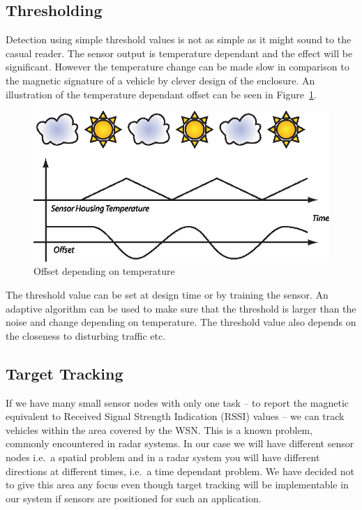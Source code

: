 \subsection{Thresholding}
Detection using simple threshold values is not as simple as it might sound to the casual reader. The sensor output is temperature dependant and the effect will be significant. However the temperature change can be made slow in comparison to the magnetic signature of a vehicle by clever design of the enclosure. An illustration of the temperature dependant offset can be seen in Figure~\ref{fig:offset}. 
\begin{figure}[htbf]
 \centering
 \begin{minipage}{0.6\linewidth}
 \centering
 \includegraphics[width=\linewidth]{images/offset}
 \caption{Offset depending on temperature}
 \label{fig:offset}
 \end{minipage}
\end{figure}

The threshold value can be set at design time or by training the sensor. An adaptive algorithm can be used to make sure that the threshold is larger than the noise and change depending on temperature. The threshold value also depends on the closeness to disturbing traffic etc.

\subsection{Target Tracking}
If we have many small sensor nodes with only one task -- to report the magnetic equivalent to Received Signal Strength Indication (RSSI) values -- we can track vehicles within the area covered by the WSN. This is a known problem, commonly encountered in radar systems. In our case we will have different sensor nodes i.e.\ a spatial problem and in a radar system you will have different directions at different times, i.e.\ a time dependant problem. We have decided not to give this area any focus even though target tracking will be implementable in our system if sensors are positioned for such an application.

